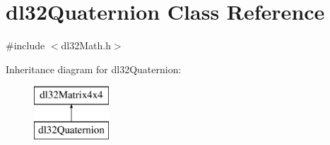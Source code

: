 \hypertarget{classdl32_quaternion}{\section{dl32\-Quaternion Class Reference}
\label{classdl32_quaternion}
}


{\ttfamily \#include $<$dl32\-Math.\-h$>$}

Inheritance diagram for dl32\-Quaternion\-:\begin{figure}[H]
\begin{center}
\leavevmode
\includegraphics[height=2.000000cm]{classdl32_quaternion}
\end{center}
\end{figure}
